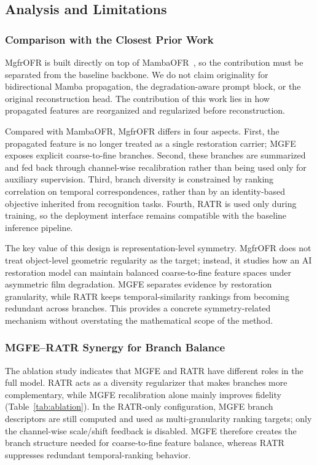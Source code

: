 \subsection{Analysis and Limitations}
\label{subsec:analysis_limitations}

\subsubsection{Comparison with the Closest Prior Work}
\label{subsec:vs_mambaofr}

MgfrOFR is built directly on top of MambaOFR~\cite{mao2025mambaofr}, so the contribution must be separated from the baseline backbone. We do not claim originality for bidirectional Mamba propagation, the degradation-aware prompt block, or the original reconstruction head. The contribution of this work lies in how propagated features are reorganized and regularized before reconstruction.

Compared with MambaOFR, MgfrOFR differs in four aspects. First, the propagated feature is no longer treated as a single restoration carrier; MGFE exposes explicit coarse-to-fine branches. Second, these branches are summarized and fed back through channel-wise recalibration rather than being used only for auxiliary supervision. Third, branch diversity is constrained by ranking correlation on temporal correspondences, rather than by an identity-based objective inherited from recognition tasks. Fourth, RATR is used only during training, so the deployment interface remains compatible with the baseline inference pipeline.

The key value of this design is representation-level symmetry. MgfrOFR does not treat object-level geometric regularity as the target; instead, it studies how an AI restoration model can maintain balanced coarse-to-fine feature spaces under asymmetric film degradation. MGFE separates evidence by restoration granularity, while RATR keeps temporal-similarity rankings from becoming redundant across branches. This provides a concrete symmetry-related mechanism without overstating the mathematical scope of the method.

\subsubsection{MGFE--RATR Synergy for Branch Balance}
\label{subsec:synergy}

The ablation study indicates that MGFE and RATR have different roles in the full model. RATR acts as a diversity regularizer that makes branches more complementary, while MGFE recalibration alone mainly improves fidelity (Table~\ref{tab:ablation}). In the RATR-only configuration, MGFE branch descriptors are still computed and used as multi-granularity ranking targets; only the channel-wise scale/shift feedback is disabled. MGFE therefore creates the branch structure needed for coarse-to-fine feature balance, whereas RATR suppresses redundant temporal-ranking behavior.

